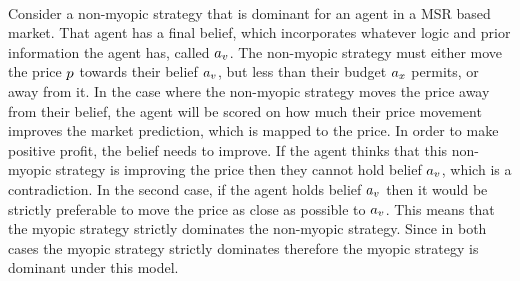  \\
Consider a non-myopic strategy that is dominant for an agent in a MSR based market. That agent has a final belief, which incorporates whatever logic and prior information the agent has, called $a_v$. The non-myopic strategy must either move the price $p$ towards their belief $a_v$, but less than their budget $a_x$ permits, or away from it. In the case where the non-myopic strategy moves the price away from their belief, the agent will be scored on how much their price movement improves the market prediction, which is mapped to the price. In order to make positive profit, the belief needs to improve. If the agent thinks that this non-myopic strategy is improving the price then they cannot hold belief $a_v$, which is a contradiction. In the second case, if the agent holds belief $a_v$ then it would be strictly preferable to move the price as close as possible to $a_v$. This means that the myopic strategy strictly dominates the non-myopic strategy. Since in both cases the myopic strategy strictly dominates therefore the myopic strategy is dominant under this model.\\